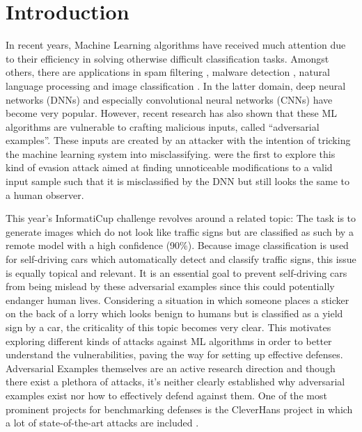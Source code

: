 \section{Introduction}

In recent years, Machine Learning algorithms have received much attention due to their efficiency in solving otherwise difficult classification tasks.
Amongst others, there are applications in spam filtering \cite{ruan2010three, clark2003neural}, malware detection \cite{dahl2013large}, natural language processing \cite{collobert2008unified} and image classification \cite{simonyan2014very, he2016deep}.
In the latter domain, deep neural networks (DNNs) and especially convolutional neural networks (CNNs) have become very popular.
However, recent research has also shown that these ML algorithms are vulnerable to crafting malicious inputs, called \enquote{adversarial examples}.
These inputs are created by an attacker with the intention of tricking the machine learning system into misclassifying.
\citet{szegedy2013intriguing} were the first to explore this kind of evasion attack aimed at finding unnoticeable modifications to a valid input sample such that it is misclassified by the DNN but still looks the same to a human observer.

This year's InformatiCup challenge revolves around a related topic: The task is to generate images which do not look like traffic signs but are classified as such by a remote model with a high confidence (90\%).
Because image classification is used for self-driving cars which automatically detect and classify traffic signs, this issue is equally topical and relevant.
It is an essential goal to prevent self-driving cars from being mislead by these adversarial examples since this could potentially endanger human lives.
Considering a situation in which someone places a sticker on the back of a lorry which looks benign to humans but is classified as a yield sign by a car, the criticality of this topic becomes very clear.
This motivates exploring different kinds of attacks against ML algorithms in order to better understand the vulnerabilities, paving the way for setting up effective defenses.
Adversarial Examples themselves are an active research direction and though there exist a plethora of attacks, it's neither clearly established why adversarial examples exist nor how to effectively defend against them.
One of the most prominent projects for benchmarking defenses is the CleverHans project in which a lot of state-of-the-art attacks are included \cite{papernot2016cleverhans}.


